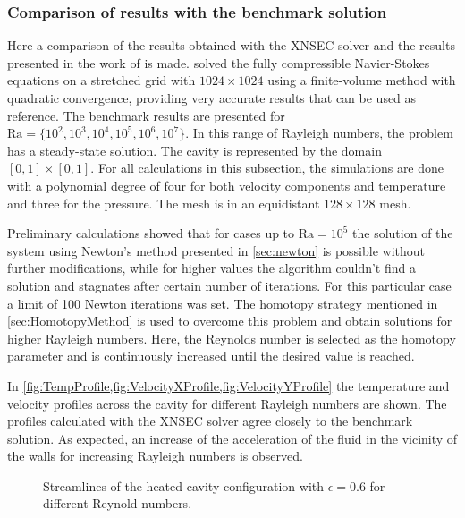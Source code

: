 \subsubsection{Comparison of results with the benchmark solution}

Here a comparison of the results obtained with the XNSEC solver and the results presented in the work of \textcite{vierendeelsBenchmarkSolutionsNatural2003} is made. \textcite{vierendeelsBenchmarkSolutionsNatural2003} solved the fully compressible Navier-Stokes equations on a stretched grid with $1024\times1024$ using a finite-volume method with quadratic convergence, providing very accurate results that can be used as reference.
The benchmark results are presented for $\text{Ra} = \{10^2,10^3,10^4,10^5,10^6,10^7\}$. In this range of Rayleigh numbers, the problem has a steady-state solution. 
The cavity is represented by the domain $[0,1]\times[0,1]$. For all calculations in this subsection, the simulations are done with a polynomial degree of four for both velocity components and temperature and three for the pressure. The mesh is in an equidistant $128\times128$ mesh.

Preliminary calculations showed that for cases up to $\text{Ra} = 10^5$ the solution of the system using Newton's method presented in \cref{sec:newton} is possible without further modifications, while for higher values the algorithm couldn't find a solution and stagnates after certain number of iterations. For this particular case a limit of 100 Newton iterations was set. The homotopy strategy mentioned in \cref{sec:HomotopyMethod} is used to overcome this problem and obtain solutions for higher Rayleigh numbers. Here, the Reynolds number is selected as the homotopy parameter and is continuously increased until the desired value is reached.

In \cref{fig:TempProfile,fig:VelocityXProfile,fig:VelocityYProfile} the temperature and velocity profiles across the cavity for different Rayleigh numbers are shown. The profiles calculated with the XNSEC solver agree closely to the benchmark solution. As expected, an increase of the acceleration of the fluid in the vicinity of the walls for increasing Rayleigh numbers is observed.
\begin{figure}[h]
	\centering
	\pgfplotsset{width=0.3 \textwidth, compat=1.3}
	\caption{Streamlines of the heated cavity configuration with $\epsilon = 0.6$ for different Reynold numbers.}\label{fig:HSCStreamlines}
\end{figure}


